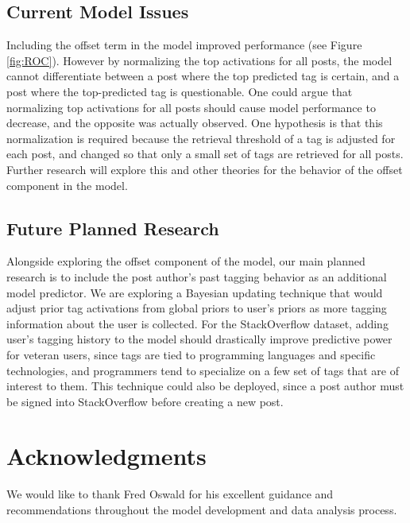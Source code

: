 \documentclass[10pt,letterpaper]{article}
\begin{document}
\subsection{Current Model Issues}

Including the offset term in the model improved performance (see Figure \ref{fig:ROC}).
However by normalizing the top activations for all posts, the model cannot differentiate between a post where the top predicted tag is certain, and a post where the top-predicted tag is questionable.
One could argue that normalizing top activations for all posts should cause model performance to decrease, and the opposite was actually observed.
One hypothesis is that this normalization is required because the retrieval threshold of a tag is adjusted for each post, and changed so that only a small set of tags are retrieved for all posts.
Further research will explore this and other theories for the behavior of the offset component in the model.

\subsection{Future Planned Research}

Alongside exploring the offset component of the model, our main planned research is to include the post author's past tagging behavior as an additional model predictor.
We are exploring a Bayesian updating technique that would adjust prior tag activations from global priors to user's priors as more tagging information about the user is collected.
For the StackOverflow dataset, adding user's tagging history to the model should drastically improve predictive power for veteran users,
since tags are tied to programming languages and specific technologies, and programmers tend to specialize on a few set of tags that are of interest to them.
This technique could also be deployed, since a post author must be signed into StackOverflow before creating a new post.

\section{Acknowledgments}

We would like to thank Fred Oswald for his excellent guidance and recommendations throughout the model development and data analysis process.


\setlength{\bibleftmargin}{.125in}
\setlength{\bibindent}{-\bibleftmargin}

\end{document}
